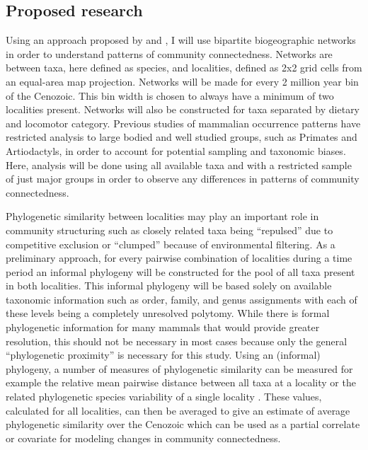 \documentclass[12pt,letterpaper]{article}
\begin{document}
\subsection{Proposed research} \label{sec:mamcommeth}
Using an approach proposed by \citet{Sidor2013} and \citet{Vilhena2013}, I will use bipartite biogeographic networks in order to understand patterns of community connectedness. Networks are between taxa, here defined as species, and localities, defined as 2x2 grid cells from an equal-area map projection. Networks will be made for every 2 million year bin of the Cenozoic. This bin width is chosen to always have a minimum of two localities present. Networks will also be constructed for taxa separated by dietary and locomotor category. Previous studies of mammalian occurrence patterns have restricted analysis to large bodied and well studied groups, such as Primates and Artiodactyls, in order to account for potential sampling and taxonomic biases. Here, analysis will be done using all available taxa and with a restricted sample of just major groups in order to observe any differences in patterns of community connectedness. 

Phylogenetic similarity between localities may play an important role in community structuring \citep{Webb2002} such as closely related taxa being ``repulsed'' due to competitive exclusion or ``clumped'' because of environmental filtering. As a preliminary approach, for every pairwise combination of localities during a time period an informal phylogeny will be constructed for the pool of all taxa present in both localities. This informal phylogeny will be based solely on available taxonomic information such as order, family, and genus assignments with each of these levels being a completely unresolved polytomy. While there is formal phylogenetic information for many mammals that would provide greater resolution, this should not be necessary in most cases because only the general ``phylogenetic proximity'' is necessary for this study. Using an (informal) phylogeny, a number of measures of phylogenetic similarity can be measured for example the relative mean pairwise distance between all taxa at a locality \citep{Webb2002} or the related phylogenetic species variability of a single locality \citet{Helmus2007a}. These values, calculated for all localities, can then be averaged to give an estimate of average phylogenetic similarity over the Cenozoic which can be used as a partial correlate or covariate for modeling changes in community connectedness.
\end{document}
